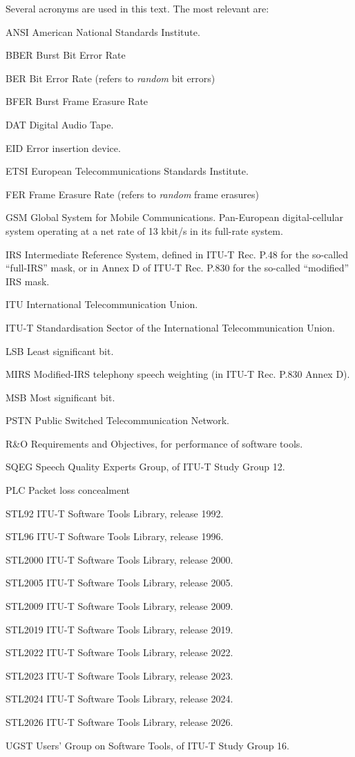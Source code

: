 Several acronyms are used in this text.
The most relevant are:
\begin{Descr}{20mm}
\item[ANSI]  American National Standards Institute.
\item[BBER]  Burst Bit Error Rate
\item[BER]   Bit Error Rate (refers to {\em random} bit errors)
\item[BFER]  Burst Frame Erasure Rate
\item[DAT]   Digital Audio Tape.
\item[EID]   Error insertion device.
\item[ETSI]  European Telecommunications Standards Institute.
\item[FER]   Frame Erasure Rate (refers to {\em random} frame erasures)
\item[GSM]   Global System for Mobile Communications. Pan-European digital-cellular system operating at a net rate of 13 kbit/s in its full-rate system.
\item[IRS]   Intermediate Reference System, defined in ITU-T Rec. P.48 for the so-called ``full-IRS'' mask, or in Annex D of ITU-T Rec. P.830 for the so-called ``modified'' IRS mask.
\item[ITU]   International Telecommunication Union.
\item[ITU-T] Standardisation Sector of the International Telecommunication Union.
\item[LSB]   Least significant bit.
\item[MIRS]  Modified-IRS telephony speech weighting (in ITU-T Rec. P.830 Annex D).
\item[MSB]   Most significant bit.
\item[PSTN]  Public Switched Telecommunication Network.
\item[R\&O]  Requirements and Objectives, for performance of software tools.
\item[SQEG]  Speech Quality Experts Group, of ITU-T Study Group 12.
\item[PLC]   Packet loss concealment
\item[STL92] ITU-T Software Tools Library, release 1992.
\item[STL96] ITU-T Software Tools Library, release 1996.
\item[STL2000] ITU-T Software Tools Library, release 2000.
\item[STL2005] ITU-T Software Tools Library, release 2005.
\item[STL2009] ITU-T Software Tools Library, release 2009.
\item[STL2019] ITU-T Software Tools Library, release 2019.
\item[STL2022] ITU-T Software Tools Library, release 2022.
\item[STL2023] ITU-T Software Tools Library, release 2023.
\item[STL2024] ITU-T Software Tools Library, release 2024.
\item[STL2026] ITU-T Software Tools Library, release 2026.
\item[UGST]  Users' Group on Software Tools, of ITU-T Study Group 16.
\end{Descr}


